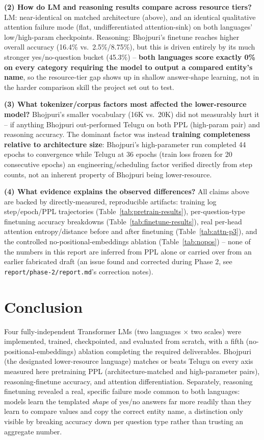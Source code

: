 \documentclass[10pt,a4paper]{article}
\begin{document}
\textbf{(2) How do LM and reasoning results compare across resource tiers?} LM: near-identical
on matched architecture (above), and an identical qualitative attention failure mode (flat,
undifferentiated attention-sink) on both languages' low/high-param checkpoints. Reasoning:
Bhojpuri's finetune reaches higher overall accuracy (16.4\% vs.\ 2.5\%/8.75\%), but this is
driven entirely by its much stronger yes/no-question bucket (45.3\%) -- \textbf{both languages
score exactly 0\% on every category requiring the model to output a compared entity's name}, so
the resource-tier gap shows up in shallow answer-shape learning, not in the harder comparison
skill the project set out to test.

\textbf{(3) What tokenizer/corpus factors most affected the lower-resource model?} Bhojpuri's
smaller vocabulary (16K vs.\ 20K) did not measurably hurt it -- if anything Bhojpuri
out-performed Telugu on both PPL (high-param pair) and reasoning accuracy. The dominant factor
was instead \textbf{training completeness relative to architecture size}: Bhojpuri's
high-parameter run completed 44 epochs to convergence while Telugu at 36 epochs (train loss
frozen for 20 consecutive epochs) an engineering/scheduling factor verified directly from step
counts, not an inherent property of Bhojpuri being lower-resource.

\textbf{(4) What evidence explains the observed differences?} All claims above are backed by
directly-measured, reproducible artifacts: training log step/epoch/PPL trajectories
(Table~\ref{tab:pretrain-results}), per-question-type finetuning accuracy breakdowns
(Table~\ref{tab:finetune-results}), real per-head attention entropy/distance before and after
finetuning (Table~\ref{tab:attn-p3}), and the controlled no-positional-embeddings ablation
(Table~\ref{tab:nopos}) -- none of the numbers in this report are inferred from PPL alone or
carried over from an earlier fabricated draft (an issue found and corrected during Phase 2, see
\texttt{report/phase-2/report.md}'s correction notes).

\section{Conclusion}
Four fully-independent Transformer LMs (two languages $\times$ two scales) were implemented,
trained, checkpointed, and evaluated from scratch, with a fifth (no-positional-embeddings)
ablation completing the required deliverables. Bhojpuri (the designated lower-resource language) matches or
beats Telugu on every axis measured here pretraining PPL (architecture-matched and
high-parameter pairs), reasoning-finetune accuracy, and attention differentiation. Separately, reasoning finetuning revealed a real, specific failure mode common
to both languages: models learn the templated \emph{shape} of yes/no answers far more readily
than they learn to compare values and copy the correct entity name, a distinction only visible
by breaking accuracy down per question type rather than trusting an aggregate number.
\end{document}
